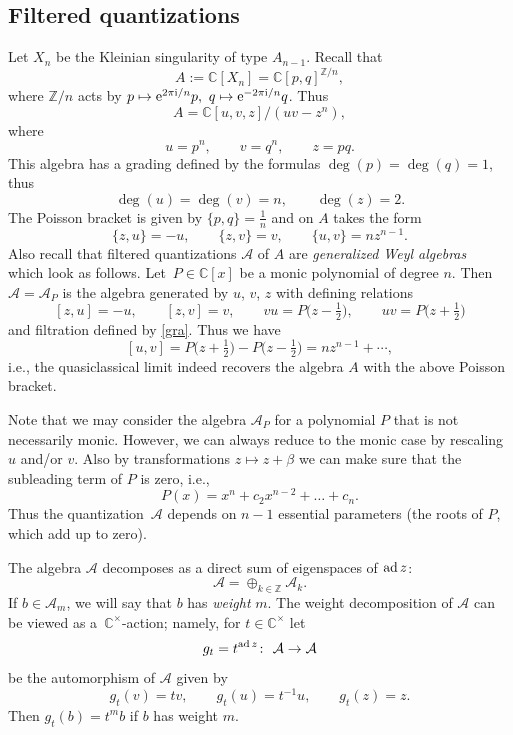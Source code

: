 \documentclass[pdftex]{sigma}
\newcommand{\CN}{\mathbb{C}} %
\newcommand{\ZN}{\mathbb{Z}} %
\newcommand{\ad}{\ensuremath\operatorname{ad}}
\newcommand{\mc}[1]{\mathcal{#1}}
\theoremstyle{definition}
\numberwithin{equation}{section}
\begin{document}
\subsection{Filtered quantizations}
Let $X_n$ be the Kleinian singularity of type $A_{n-1}$.
Recall that
\[
A:=\mathbb C[X_n]=\CN[p,q]^{\mathbb Z/n},
\]
where
$\mathbb Z/n$ acts by $p\mapsto {\rm e}^{2\pi {\rm i}/n}p,\ q\mapsto {\rm e}^{-2\pi {\rm i}/n}q$.
Thus
\[
A=\mathbb C[u,v,z]/(uv-z^n),
\]
where
\[
u=p^n,\qquad
v=q^n,\qquad
z=pq.
\]
This algebra has a grading defined by the formulas $\deg(p)=\deg(q)=1$, thus
\begin{equation}\label{gra}
 \deg(u)=\deg(v)=n,\qquad
 \deg(z)=2.
 \end{equation}
The Poisson bracket is given by $\lbrace{p,q\rbrace}=\frac{1}{n}$
and on $A$ takes the form
\[
 \lbrace z,u\rbrace =-u,\qquad
 \lbrace z,v\rbrace=v,\qquad
 \lbrace u,v\rbrace=nz^{n-1}.
\]
Also recall that filtered quantizations $\mathcal A$ of $A$ are {\it generalized Weyl algebras}~\cite{B} which look as follows. Let~$P\in \mathbb C[x]$ be a monic polynomial of degree $n$. Then $\mc{A}=\mc A_P$ is the algebra generated by $u$, $v$, $z$ with defining relations
\[
[z,u]=-u,\qquad
[z,v]=v,\qquad
vu=P\big(z-\tfrac{1}{2}\big),\qquad
uv=P\big(z+\tfrac{1}{2}\big)
\]
and filtration defined by \eqref{gra}.
Thus we have
\[
[u,v]=P\big(z+\tfrac{1}{2}\big)-P\big(z-\tfrac{1}{2}\big)=nz^{n-1}+\cdots ,
\]
i.e., the quasiclassical limit indeed recovers the algebra $A$ with the above Poisson bracket.

Note that we may consider the algebra $\mc A_P$ for a polynomial $P$ that is not necessarily monic. However, we can always reduce to the monic case by rescaling $u$ and/or $v$. Also by transformations $z\mapsto z+\beta$ we can make sure that the subleading term of $P$ is zero, i.e.,
\[
P(x)=x^n+c_2x^{n-2}+\dots +c_n.
\]
Thus the quantization~$\mc A$ depends on $n-1$ essential parameters (the roots of $P$, which add up to zero).

The algebra $\mc A$ decomposes as a direct sum of eigenspaces of
$\ad z$:
\[
\mc{A}=\oplus_{k\in \ZN}\mc{A}_{k}.
\]
If $b\in \mc A_m$, we will say that $b$ has {\it weight} $m$.
The weight decomposition of $\mc A$ can be viewed as a~$\mathbb C^\times$-action; namely, for $t\in \mathbb C^\times$ let
\begin{equation}\label{gt}
g_t=t^{\ad z}\colon \ \mc{A}\to \mc{A}
\end{equation}
be the automorphism of $\mc{A}$ given by
\[
g_t(v)= tv,\qquad
g_t(u)=t^{-1}u,\qquad
g_t(z)=z.
\]
Then $g_t(b)=t^mb$ if $b$ has weight $m$.
\end{document}
